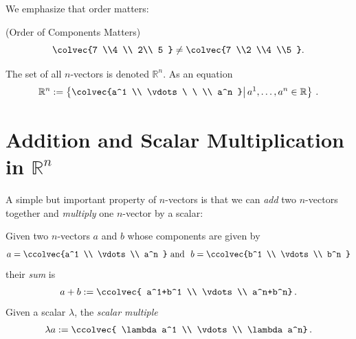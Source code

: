 \vspace{1mm}
We emphasize  that order matters: 
\begin{example} (Order of Components Matters)
\[\colvec{7 \\4 \\ 2\\ 5 } 
\neq \colvec{7 \\2 \\4 \\5 } .\]
\end{example}
The set of all $n$-vectors is denoted $\mathbb{R}^n$. As an equation
\[
{\mathbb{R}}^n :=\left\{ \colvec{a^1 \\ \vdots\ \  \\ a^n } \middle\vert \,  a^1,\dots, a^n \in \mathbb{R} \right\} \,.
\]




\section{Addition and Scalar Multiplication in ${\mathbb{R}}^n$}
A simple but important property of $n$-vectors is that we can {\itshape add} two $n$-vectors together and {\itshape multiply} one $n$-vector by a scalar:

\begin{definition} Given two $n$-vectors \(a\) and \(b\) whose components are given by 
\[a=\ccolvec{a^1 \\ \vdots  \\ a^n } \mbox{ and }\  b=\ccolvec{b^1 \\ \vdots  \\ b^n }\] their \emph{sum} is \[a+b := \ccolvec{ a^1+b^1 \\ \vdots \\ a^n+b^n}\, .\]  
Given a scalar $\lambda$, the \emph{scalar multiple} \[\lambda a := \ccolvec{ \lambda a^1 \\ \vdots \\ \lambda a^n}\, .\]
\end{definition}


